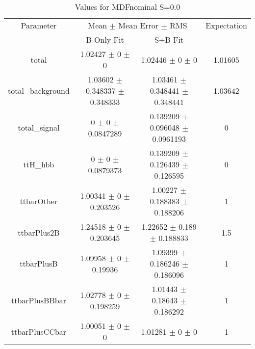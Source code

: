\begin{table}
\centering
\caption{Values for MDFnominal S=0.0}
\begin{tabular}{cccc}
\toprule
Parameter & \multicolumn{2}{c}{Mean $\pm$ Mean Error $\pm$ RMS} & Expectation\\
 & B-Only Fit & S+B Fit & \\
\midrule
total & \num{1.02427} $\pm$ \num{0} $\pm$ \num{0} & \num{1.02446} $\pm$ \num{0} $\pm$ \num{0} & \num{1.01605}\\
total\_background & \num{1.03602} $\pm$ \num{0.348337} $\pm$ \num{0.348333} & \num{1.03461} $\pm$ \num{0.348441} $\pm$ \num{0.348441} & \num{1.03642}\\
total\_signal & \num{0} $\pm$ \num{0} $\pm$ \num{0.0847289} & \num{0.139209} $\pm$ \num{0.096048} $\pm$ \num{0.0961193} & \num{0}\\
ttH\_hbb & \num{0} $\pm$ \num{0} $\pm$ \num{0.0879373} & \num{0.139209} $\pm$ \num{0.126439} $\pm$ \num{0.126595} & \num{0}\\
ttbarOther & \num{1.00341} $\pm$ \num{0} $\pm$ \num{0.203526} & \num{1.00227} $\pm$ \num{0.188383} $\pm$ \num{0.188206} & \num{1}\\
ttbarPlus2B & \num{1.24518} $\pm$ \num{0} $\pm$ \num{0.203645} & \num{1.22652} $\pm$ \num{0.189} $\pm$ \num{0.188833} & \num{1.5}\\
ttbarPlusB & \num{1.09958} $\pm$ \num{0} $\pm$ \num{0.19936} & \num{1.09399} $\pm$ \num{0.186246} $\pm$ \num{0.186096} & \num{1}\\
ttbarPlusBBbar & \num{1.02778} $\pm$ \num{0} $\pm$ \num{0.198259} & \num{1.01443} $\pm$ \num{0.18643} $\pm$ \num{0.186292} & \num{1}\\
ttbarPlusCCbar & \num{1.00051} $\pm$ \num{0} $\pm$ \num{0} & \num{1.01281} $\pm$ \num{0} $\pm$ \num{0} & \num{1}\\
\bottomrule
\end{tabular}
\end{table}